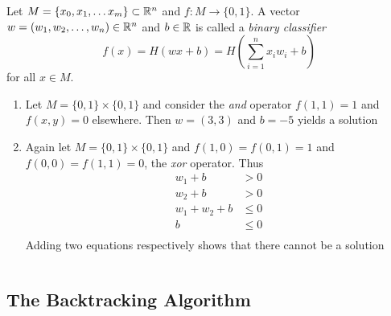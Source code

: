 \begin{definition}
Let \( M = \{ x_0, x_1, \dots x_m \} \subset \mathbb{R}^n \) and \( f: M \to \{ 0, 1 \} \).
A vector \( w = (w_1, w_2, \dots, w_n) \in \mathbb{R}^n \) and \( b \in \mathbb{R} \) is called a \emph{binary classifier} 
	\[
		f(x) = H(wx + b) = H(\sum_{i=1}^n x_i w_i + b)
	\]
for all \( x \in M \).
\end{definition}
\bigskip


\begin{examples}\hfill
    \begin{enumerate}
        \item Let \( M = \{ 0, 1 \} \times \{ 0, 1 \} \) and consider the \emph{and} operator 
		    \( f(1, 1) = 1 \) and \( f(x, y) = 0 \) elsewhere. Then \( w = (3, 3) \) and \( b = -5 \) 
			yields a solution
        \item Again let \( M = \{ 0, 1 \} \times \{ 0, 1 \} \) and \( f(1, 0) = f(0, 1) = 1 \) and 
			\( f(0, 0) = f(1, 1) = 0 \), the \emph{xor} operator. Thus
				\[
					\begin{split}
						w_1 + b & > 0 \\
						w_2 + b & > 0 \\
						w_1 + w_2 + b & \le 0 \\
						b & \le 0 \\
					\end{split}
				\]
			Adding two equations respectively shows that there cannot be a solution
	\end{enumerate}
\end{examples}
\bigskip


\begin{algorithm}[Perceptron]\label{algo:perceptron}
\end{algorithm}
\inputminted[fontsize=\small, framesep=0.35cm, frame=lines, python3=true]{python}{perceptron.py}
\bigskip


\subsection{The Backtracking Algorithm}


